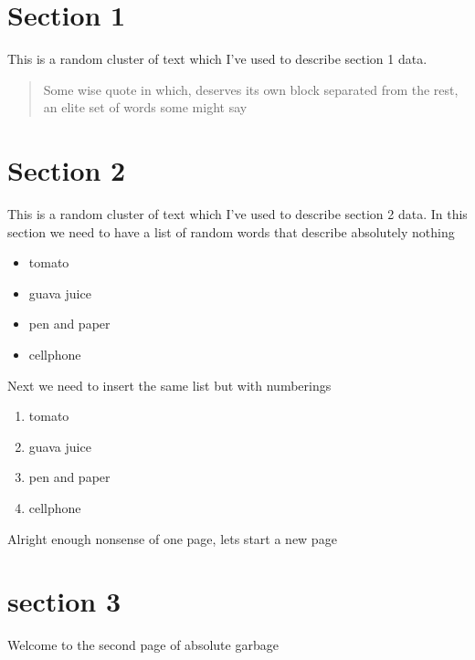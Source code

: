 \documentclass[12pt]{report}
\begin{document}
\section{Section 1}
This is a random cluster of text which I've used to describe section 1 data.

\begin{quote}
Some wise quote in which, deserves its own block separated from the rest, an elite set of words some might say
\end{quote}

\section{Section 2}
This is a random cluster of text which I've used to describe section 2 data.
In this section we need to have a list of random words that describe absolutely nothing
\begin{itemize}
\item tomato
\item guava juice
\item pen and paper
\item cellphone
\end{itemize}

Next we need to insert the same list but with numberings

\begin{enumerate}
\item tomato
\item guava juice
\item pen and paper
\item cellphone
\end{enumerate}

Alright enough nonsense of one page, lets start a new page 

\newpage

\section{section 3}
Welcome to the second page of absolute garbage
\end{document}
